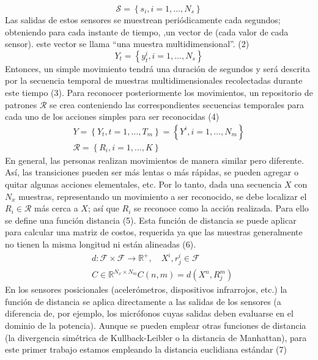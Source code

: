 \documentclass[10pt]{article}
\begin{document}
$$
\mathcal{S}=\left\{s_{i}, i=1, \ldots, N_{s}\right\}
$$
Las salidas de estos sensores se muestrean periódicamente cada    segundos; obteniendo para cada instante de tiempo,  ,un vector de    (cada valor de cada sensor). este vector    se llama “una muestra multidimensional”. (2) 
$$
Y_{t}=\left\{y_{t}^{i}, i=1, \ldots, N_{s}\right\}
$$
Entonces, un simple movimiento  tendrá una duración de    segundos y será descrita por la secuencia temporal de    muestras multidimensionales recolectadas durante este tiempo (3). Para reconocer posteriormente los movimientos, un repositorio de patrones $\mathcal{R}$ se crea conteniendo las correspondientes secuencias temporales para cada uno de los  acciones simples para ser reconocidas (4)
$$
\begin{gathered}
Y=\left\{Y_{t}, t=1, \ldots, T_{m}\right\}=\left\{Y^{i}, i=1, \ldots, N_{m}\right\} \\
\mathcal{R}=\left\{R_{i}, i=1, \ldots, K\right\}
\end{gathered}
$$
En general, las personas realizan movimientos de manera similar pero diferente. Así, las transiciones pueden ser más lentas o más rápidas, se pueden agregar o quitar algunas acciones elementales, etc.  Por lo tanto, dada una secuencia $X$ con $N_{x}$ muestras, representando un movimiento a ser reconocido, se debe localizar el $R_{i} \in \mathcal{R}$ más cerca a $X$; así que $R_{i}$ se reconoce como la acción realizada. Para ello se define una función distancia (5). Esta función de distancia se puede aplicar para calcular una matriz de costos, requerida ya que las muestras generalmente no tienen la misma longitud ni están alineadas (6).
$$
\begin{aligned}
&d: \mathcal{F} \times \mathcal{F} \rightarrow \mathbb{R}^{+}, \quad X^{i}, r_{j}^{i} \in \mathcal{F} \\
&C \in \mathbb{R}^{N_{x} \times N_{m}} C(n, m)=d\left(X^{n}, R_{j}^{m}\right)
\end{aligned}
$$
En los sensores posicionales (acelerómetros, dispositivos infrarrojos, etc.) la función de distancia se aplica directamente a las salidas de los sensores (a diferencia de, por ejemplo, los micrófonos cuyas salidas deben evaluarse en el dominio de la potencia). Aunque se pueden emplear otras funciones de distancia (la divergencia simétrica de Kullback-Leibler o la distancia de Manhattan), para este primer trabajo estamos empleando la distancia euclidiana estándar (7)
\end{document}
